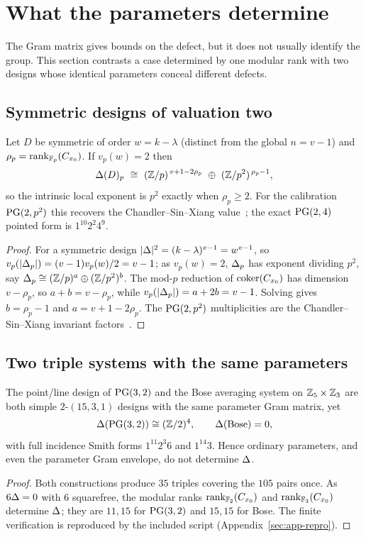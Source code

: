\section{What the parameters determine}\label{sec:parameters}

The Gram matrix gives bounds on the defect, but it does not usually identify
the group. This section contrasts a case determined by one modular rank with
two designs whose identical parameters conceal different defects.

\subsection{Symmetric designs of valuation two}

\begin{theorem}\label{thm:v2}
Let $D$ be symmetric of order $w=k-\lambda$ (distinct from the global
$n=v-1$) and $\rho_p=\operatorname{rank}_{\mathbb{F}_p}(C_{x_0})$. If $v_p(w)=2$ then
\[
\Delt(D)_p\ \cong\ (\ZZ/p)^{\,v+1-2\rho_p}\ \oplus\ (\ZZ/p^{2})^{\,\rho_p-1},
\]
so the intrinsic local exponent is $p^{2}$ exactly when $\rho_p\ge2$. For the
calibration $\mathrm{PG}(2,p^{2})$ this recovers the Chandler--Sin--Xiang
value~\cite{ChandlerSinXiang}; the exact $\mathrm{PG}(2,4)$ pointed form is
$1^{10}2^{2}4^{9}$.
\end{theorem}

\begin{proof}
For a symmetric design $|\Delta|^{2}=(k-\lambda)^{v-1}=w^{v-1}$, so
$v_p(|\Delta_p|)=(v-1)v_p(w)/2=v-1$; as $v_p(w)=2$, $\Delta_p$ has exponent
dividing $p^{2}$, say $\Delta_p\cong(\mathbb{Z}/p)^{a}\oplus(\mathbb{Z}/p^{2})^{b}$. The mod-$p$
reduction of $\operatorname{coker}(C_{x_0})$ has dimension $v-\rho_p$, so $a+b=v-\rho_p$, while
$v_p(|\Delta_p|)=a+2b=v-1$. Solving gives $b=\rho_p-1$ and $a=v+1-2\rho_p$. The
$\mathrm{PG}(2,p^{2})$ multiplicities are the Chandler--Sin--Xiang invariant
factors~\cite{ChandlerSinXiang}.
\end{proof}

\subsection{Two triple systems with the same parameters}

\begin{theorem}\label{thm:sep}
The point/line design of $\mathrm{PG}(3,2)$ and the Bose averaging system on
$\mathbb{Z}_5\times\mathbb{Z}_3$ are both simple $2$-$(15,3,1)$ designs with the same
parameter Gram matrix, yet
\[
\Delta(\mathrm{PG}(3,2))\cong(\mathbb{Z}/2)^{4},\qquad \Delta(\text{Bose})=0,
\]
with full incidence Smith forms $1^{11}2^{3}6$ and $1^{14}3$. Hence ordinary
parameters, and even the parameter Gram envelope, do not determine $\Delta$.
\end{theorem}

\begin{proof}
Both constructions produce $35$ triples covering the $105$ pairs once. As
$6\Delta=0$ with $6$ squarefree, the modular ranks $\operatorname{rank}_{\mathbb{F}_2}(C_{x_0})$ and
$\operatorname{rank}_{\mathbb{F}_3}(C_{x_0})$ determine $\Delta$; they are $11,15$ for $\mathrm{PG}(3,2)$ and
$15,15$ for Bose. The finite verification is reproduced by the included script
(Appendix~\ref{sec:app-repro}).
\end{proof}
